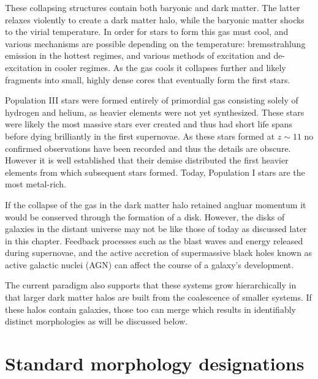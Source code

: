These collapsing structures contain both baryonic and dark matter. The latter relaxes violently to create a dark matter halo, while the baryonic matter shocks to the virial temperature. In order for stars to form this gas must cool, and various mechanisms are possible depending on the temperature: bremsstrahlung emission in the hottest regimes, and various methods of excitation and de-excitation in cooler regimes. As the gas cools it collapses further and likely fragments into small, highly dense cores that eventually form the first stars. 

Population III stars were formed entirely of primordial gas consisting solely of hydrogen and helium, as heavier elements were not yet synthesized. These stars were likely the most massive stars ever created and thus had short life spans before dying brilliantly in the first supernovae. As these stars formed at $z\sim11$ no confirmed observations have been recorded and thus the details are obscure. However it is well established that their demise distributed the first heavier elements from which subsequent stars formed. Today, Population I stars are the most metal-rich. 

If the collapse of the gas in the dark matter halo retained angluar momentum it would be conserved through the formation of a disk. However, the disks of galaxies in the distant universe may not be like those of today as discussed later in this chapter. Feedback processes such as the blast waves and energy released during supernovae, and the active accretion of supermassive black holes known as active galactic nuclei (AGN) can affect the course of a galaxy's development. 

The current paradigm also supports that these systems grow hierarchically in that larger dark matter halos are built from the coalescence of smaller systems. If these halos contain galaxies, those too can merge which results in identifiably distinct morphologies as will be discussed below. 




\section{Standard morphology designations}


